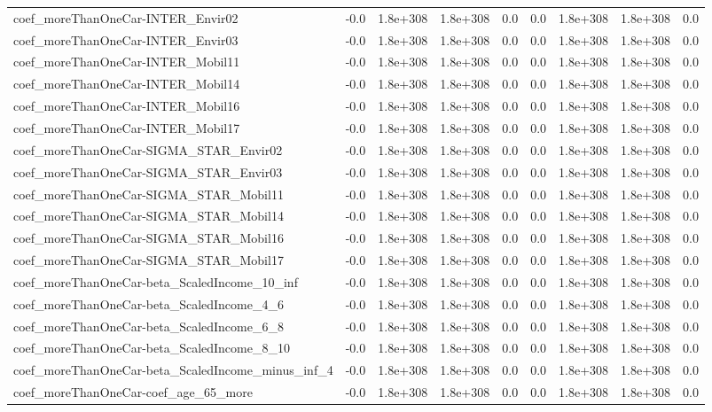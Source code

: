 \begin{tabular}{lrrrrrrrr}
coef_moreThanOneCar-INTER_Envir02 & -0.0 & 1.8e+308 & 1.8e+308 & 0.0 & 0.0 & 1.8e+308 & 1.8e+308 & 0.0 \\
coef_moreThanOneCar-INTER_Envir03 & -0.0 & 1.8e+308 & 1.8e+308 & 0.0 & 0.0 & 1.8e+308 & 1.8e+308 & 0.0 \\
coef_moreThanOneCar-INTER_Mobil11 & -0.0 & 1.8e+308 & 1.8e+308 & 0.0 & 0.0 & 1.8e+308 & 1.8e+308 & 0.0 \\
coef_moreThanOneCar-INTER_Mobil14 & -0.0 & 1.8e+308 & 1.8e+308 & 0.0 & 0.0 & 1.8e+308 & 1.8e+308 & 0.0 \\
coef_moreThanOneCar-INTER_Mobil16 & -0.0 & 1.8e+308 & 1.8e+308 & 0.0 & 0.0 & 1.8e+308 & 1.8e+308 & 0.0 \\
coef_moreThanOneCar-INTER_Mobil17 & -0.0 & 1.8e+308 & 1.8e+308 & 0.0 & 0.0 & 1.8e+308 & 1.8e+308 & 0.0 \\
coef_moreThanOneCar-SIGMA_STAR_Envir02 & -0.0 & 1.8e+308 & 1.8e+308 & 0.0 & 0.0 & 1.8e+308 & 1.8e+308 & 0.0 \\
coef_moreThanOneCar-SIGMA_STAR_Envir03 & -0.0 & 1.8e+308 & 1.8e+308 & 0.0 & 0.0 & 1.8e+308 & 1.8e+308 & 0.0 \\
coef_moreThanOneCar-SIGMA_STAR_Mobil11 & -0.0 & 1.8e+308 & 1.8e+308 & 0.0 & 0.0 & 1.8e+308 & 1.8e+308 & 0.0 \\
coef_moreThanOneCar-SIGMA_STAR_Mobil14 & -0.0 & 1.8e+308 & 1.8e+308 & 0.0 & 0.0 & 1.8e+308 & 1.8e+308 & 0.0 \\
coef_moreThanOneCar-SIGMA_STAR_Mobil16 & -0.0 & 1.8e+308 & 1.8e+308 & 0.0 & 0.0 & 1.8e+308 & 1.8e+308 & 0.0 \\
coef_moreThanOneCar-SIGMA_STAR_Mobil17 & -0.0 & 1.8e+308 & 1.8e+308 & 0.0 & 0.0 & 1.8e+308 & 1.8e+308 & 0.0 \\
coef_moreThanOneCar-beta_ScaledIncome_10_inf & -0.0 & 1.8e+308 & 1.8e+308 & 0.0 & 0.0 & 1.8e+308 & 1.8e+308 & 0.0 \\
coef_moreThanOneCar-beta_ScaledIncome_4_6 & -0.0 & 1.8e+308 & 1.8e+308 & 0.0 & 0.0 & 1.8e+308 & 1.8e+308 & 0.0 \\
coef_moreThanOneCar-beta_ScaledIncome_6_8 & -0.0 & 1.8e+308 & 1.8e+308 & 0.0 & 0.0 & 1.8e+308 & 1.8e+308 & 0.0 \\
coef_moreThanOneCar-beta_ScaledIncome_8_10 & -0.0 & 1.8e+308 & 1.8e+308 & 0.0 & 0.0 & 1.8e+308 & 1.8e+308 & 0.0 \\
coef_moreThanOneCar-beta_ScaledIncome_minus_inf_4 & -0.0 & 1.8e+308 & 1.8e+308 & 0.0 & 0.0 & 1.8e+308 & 1.8e+308 & 0.0 \\
coef_moreThanOneCar-coef_age_65_more & -0.0 & 1.8e+308 & 1.8e+308 & 0.0 & 0.0 & 1.8e+308 & 1.8e+308 & 0.0 \\

\end{tabular}

